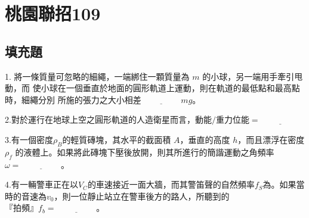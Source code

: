 \documentclass[cn,10pt,math=newtx,chinesefont=founder,device=ig]{elegantbook}
\begin{document}
\chapter{桃園聯招109}
\section{填充題}

\begin{example}
   1. 將一條質量可忽略的細繩，一端綁住一顆質量為 $m$ 的小球，另一端用手牽引甩動，而
使小球在一個垂直於地面的圓形軌道上運動，則在軌道的最低點和最高點時，細繩分別
所施的張力之大小相差$\underline{\hspace{2cm}} mg$。\\
    \rightline{[桃園聯招教甄109]}
\end{example}
\begin{solution}
    
\end{solution}

\newpage


\begin{example}
   2.對於運行在地球上空之圓形軌道的人造衛星而言，$動能/重力位能 =\underline{\hspace{2cm}}$
   \\
    \rightline{[桃園聯招教甄109]}
\end{example}
\begin{solution}
    
\end{solution}

\newpage


\begin{example}
   3.有一個密度$\rho_B$的輕質磚塊，其水平的截面積 $A$，垂直的高度 $h$，而且漂浮在密度$\rho_f$
的液體上。如果將此磚塊下壓後放開，則其所進行的簡諧運動之角頻率 $\omega =\underline{\hspace{2cm}}$。\\
    \rightline{[桃園聯招教甄109]}
\end{example}
\begin{solution}
    
\end{solution}

\newpage


\begin{example}
   4.有一輛警車正在以$V_C$的車速接近一面大牆，而其警笛聲的自然頻率$f_S$為。如果當時的音速為$v_0$，則一位靜止站立在警車後方的路人，所聽到的$『拍頻』 f_b = \underline{\hspace{2cm}}$。\\
    \rightline{[桃園聯招教甄109]}
\end{example}
\begin{solution}
    
\end{solution}
\end{document}
